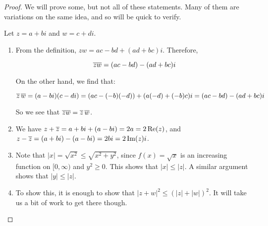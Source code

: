 \begin{proof} We will prove some, but not all of these statements. Many of them are variations on the same idea, and so will be quick to verify.

Let $z = a+ bi$ and $w = c + di$.

\begin{enumerate}
\item From the definition, $zw = ac -bd + (ad + bc)i$. Therefore, 

$$\overline{zw} = (ac - bd) - (ad + bc)i$$

On the other hand, we find that:

$$\overline{z}\,\overline{w} = (a-bi)(c-di) = (ac - (-b)(-d)) + (a(-d) + (-b)c)i = (ac - bd) - (ad +bc)i$$

So we see that $\overline{zw} = \overline{z}\,\overline{w}$.

\setcounter{enumi}{3}

\item We have $z + \overline{z} = a + bi + (a-bi) = 2a = 2\operatorname{Re}(z)$, and $z - \overline{z} = (a + bi) - (a-bi) = 2bi = 2\operatorname{Im}(z)i$.

\setcounter{enumi}{7}

\item  Note that $|x| = \sqrt{x^2} \le \sqrt{x^2 + y^2}$, since $f(x) =\sqrt{x}$ is an increasing function on $[0,\infty)$ and $y^2\ge 0$. This shows that $|x| \le |z|$. A similar argument shows that $|y| \le |z|$.

\item To show this, it is enough to show that $|z+w|^2 \le (|z| + |w|)^2$. It will take us a bit of work to get there though.

%
%
%
%
%
%
%
%
%
%
%
%
%



\end{enumerate}
\end{proof}
